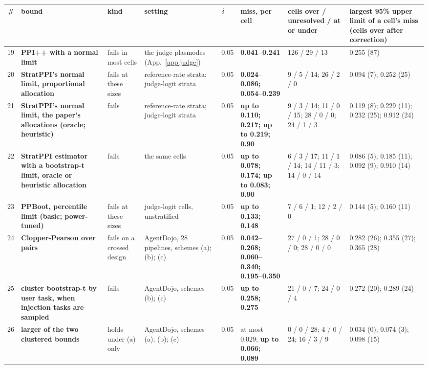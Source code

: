 \begin{tabular}{@{}r p{2.8cm} p{2.0cm} p{3.9cm} l p{2.1cm} p{2.0cm} p{1.9cm}@{}}
\toprule
\textbf{\#} & \textbf{bound} & \textbf{kind} & \textbf{setting} & \textbf{$\delta$} & \textbf{miss, per cell} & \textbf{cells over / unresolved / at or under} & \textbf{largest 95\% upper limit of a cell's miss (cells over after correction)} \\
\midrule
19 & \textbf{PPI++ with a normal limit} & fails in most cells & the judge plasmodes (App.~\ref{app:judge}) & 0.05 & \textbf{0.041--0.241} & 126 / 29 / 13 & 0.255 (87) \\
20 & \textbf{StratPPI's normal limit, proportional allocation} & fails at these sizes & reference-rate strata; judge-logit strata & 0.05 & \textbf{0.024--0.086; 0.054--0.239} & 9 / 5 / 14; 26 / 2 / 0 & 0.094 (7); 0.252 (25) \\
21 & \textbf{StratPPI's normal limit, the paper's allocations (oracle; heuristic)} & fails & reference-rate strata; judge-logit strata & 0.05 & \textbf{up to 0.110; 0.217; up to 0.219; 0.90} & 9 / 3 / 14; 11 / 0 / 15; 28 / 0 / 0; 24 / 1 / 3 & 0.119 (8); 0.229 (11); 0.232 (25); 0.912 (24) \\
22 & \textbf{StratPPI estimator with a bootstrap-t limit, oracle or heuristic allocation} & fails & the same cells & 0.05 & \textbf{up to 0.078; 0.174; up to 0.083; 0.90} & 6 / 3 / 17; 11 / 1 / 14; 14 / 11 / 3; 14 / 0 / 14 & 0.086 (5); 0.185 (11); 0.092 (9); 0.910 (14) \\
23 & \textbf{PPBoot, percentile limit (basic; power-tuned)} & fails at these sizes & judge-logit cells, unstratified & 0.05 & \textbf{up to 0.133; 0.148} & 7 / 6 / 1; 12 / 2 / 0 & 0.144 (5); 0.160 (11) \\
24 & \textbf{Clopper-Pearson over pairs} & fails on a crossed design & AgentDojo, 28 pipelines, schemes (a); (b); (c) & 0.05 & \textbf{0.042--0.268; 0.060--0.340; 0.195--0.350} & 27 / 0 / 1; 28 / 0 / 0; 28 / 0 / 0 & 0.282 (26); 0.355 (27); 0.365 (28) \\
25 & \textbf{cluster bootstrap-t by user task, when injection tasks are sampled} & fails & AgentDojo, schemes (b); (c) & 0.05 & \textbf{up to 0.258; 0.275} & 21 / 0 / 7; 24 / 0 / 4 & 0.272 (20); 0.289 (24) \\
26 & \textbf{larger of the two clustered bounds} & holds under (a) only & AgentDojo, schemes (a); (b); (c) & 0.05 & at most 0.029; \textbf{up to 0.066; 0.089} & 0 / 0 / 28; 4 / 0 / 24; 16 / 3 / 9 & 0.034 (0); 0.074 (3); 0.098 (15) \\

\end{tabular}
